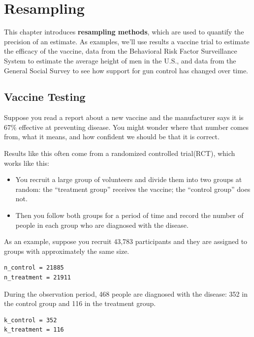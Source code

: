 \hypertarget{resampling}{%
\chapter{Resampling}\label{resampling}}

This chapter introduces \textbf{resampling methods}, which are used to
quantify the precision of an estimate. As examples, we'll use results a
vaccine trial to estimate the efficacy of the vaccine, data from the
Behavioral Risk Factor Surveillance System to estimate the average
height of men in the U.S., and data from the General Social Survey to
see how support for gun control has changed over time.

\hypertarget{vaccine-testing}{%
\section{Vaccine Testing}\label{vaccine-testing}}

Suppose you read a report about a new vaccine and the manufacturer says
it is 67\% effective at preventing disease. You might wonder where that
number comes from, what it means, and how confident we should be that it
is correct.

Results like this often come from a randomized controlled trial(RCT),
which works like this:

\begin{itemize}
\item
  You recruit a large group of volunteers and divide them into two
  groups at random: the ``treatment group'' receives the vaccine; the
  ``control group'' does not.
\item
  Then you follow both groups for a period of time and record the number
  of people in each group who are diagnosed with the disease.
\end{itemize}

As an example, suppose you recruit 43,783 participants and they are
assigned to groups with approximately the same size.

\begin{lstlisting}[]
n_control = 21885
n_treatment = 21911
\end{lstlisting}

During the observation period, 468 people are diagnosed with the
disease: 352 in the control group and 116 in the treatment group.

\begin{lstlisting}[]
k_control = 352
k_treatment = 116
\end{lstlisting}


